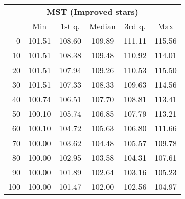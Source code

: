 \begin{tabular}{r|ccccc}
  \multicolumn{6}{c}{{\bf MST (Improved stars)}} \\
  & Min & 1st q. & Median & 3rd q. & Max \\ \hline\hline
  0 & 101.51 & 108.60 & 109.89 & 111.11 & 115.56
\\ 10 & 101.51 & 108.38 & 109.48 & 110.92 & 114.01
\\ 20 & 101.51 & 107.94 & 109.26 & 110.53 & 115.50
\\ 30 & 101.51 & 107.33 & 108.33 & 109.63 & 114.56
\\ 40 & 100.74 & 106.51 & 107.70 & 108.81 & 113.41
\\ 50 & 100.10 & 105.74 & 106.85 & 107.79 & 113.21
\\ 60 & 100.10 & 104.72 & 105.63 & 106.80 & 111.66
\\ 70 & 100.00 & 103.62 & 104.48 & 105.57 & 109.78
\\ 80 & 100.00 & 102.95 & 103.58 & 104.31 & 107.61
\\ 90 & 100.00 & 101.89 & 102.64 & 103.16 & 105.23
\\ 100 & 100.00 & 101.47 & 102.00 & 102.56 & 104.97
\end{tabular}
